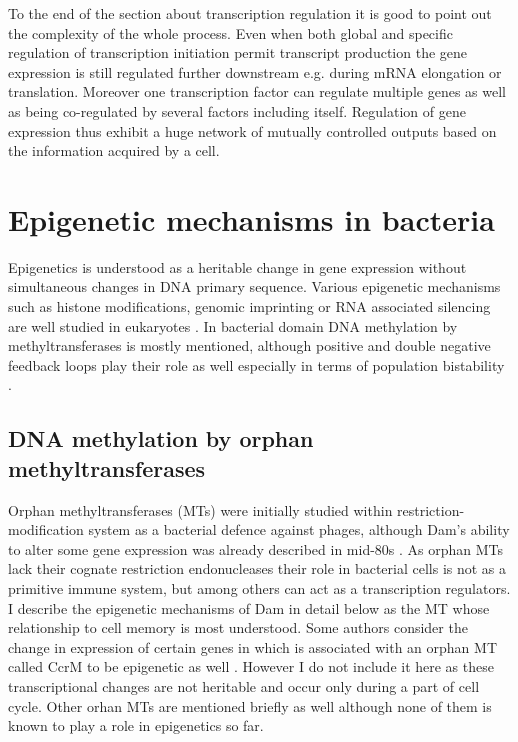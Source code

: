 To the end of the section about transcription regulation it is good to point out the complexity of the whole process.
Even when both global and specific regulation of transcription initiation permit transcript production the gene expression is still regulated further downstream e.g. during mRNA elongation or translation.
Moreover one transcription factor can regulate multiple genes as well as being co-regulated by several factors including itself.
Regulation of gene expression thus exhibit a huge network of mutually controlled outputs based on the information acquired by a cell.


\section{Epigenetic mechanisms in bacteria}
Epigenetics is understood as a heritable change in gene expression without simultaneous changes in DNA primary sequence.
Various epigenetic mechanisms such as histone modifications, genomic imprinting or RNA associated silencing are well studied in eukaryotes \cite{durso2014mechanisms}.
In bacterial domain DNA methylation by methyltransferases is mostly mentioned, although positive and double negative feedback loops play their role as well especially in terms of population bistability \cite{casadesus2006epigenetic, casadesus2013programmed, adhikari2016dna}.

\subsection{DNA methylation by orphan methyltransferases}
Orphan methyltransferases (MTs) were initially studied within restriction-modification system as a bacterial defence against phages, although Dam's ability to alter some gene expression was already described in mid-80s \cite{sternberg1985evidence, bickle1993biology}.
As orphan MTs lack their cognate restriction endonucleases their role in bacterial cells is not as a primitive immune system, but among others can act as a transcription regulators.
I describe the epigenetic mechanisms of Dam in detail below as the MT whose relationship to cell memory is most understood.
Some authors consider the change in expression of certain genes in  which is associated with an orphan MT called CcrM to be epigenetic as well \cite{casadesus2006epigenetic, adhikari2016dna}.
However I do not include it here as these transcriptional changes are not heritable and occur only during a part of cell cycle.
Other  orhan MTs are mentioned briefly as well although none of them is known to play a role in epigenetics so far.

